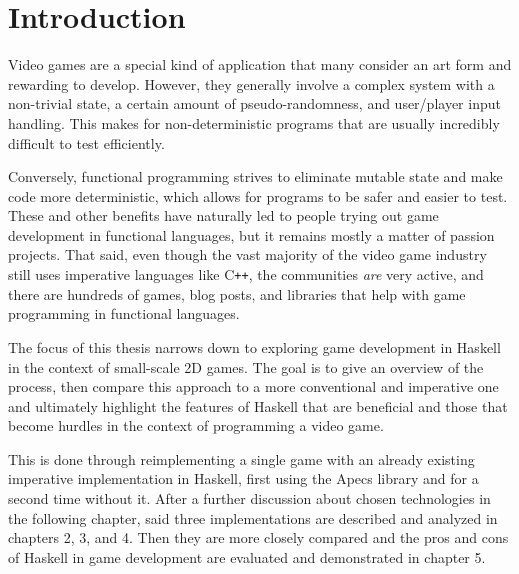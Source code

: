 \documentclass[
  digital, %
  color,   %
  table,   %
  oneside, %
  lof,     %
  lot,     %
]{fithesis3}
\newcommand{\cpp}{C\nolinebreak\texttt{+}\nolinebreak\texttt{+}}
\begin{document}
\chapter*{Introduction}
\label{chptr:introduction}


Video games are a special kind of application that many consider an art form
and rewarding to develop. However, they generally involve a complex system
with a non-trivial state, a certain amount of pseudo-randomness,
and user/player input handling. This makes for non-deterministic
programs that are usually incredibly difficult to test efficiently.

Conversely, functional programming strives to eliminate
mutable state and make code more deterministic, which allows for
programs to be safer and easier to test.
These and other benefits have naturally led to people
trying out game development in functional languages, but
it remains mostly a matter of passion projects.
That said, even though the vast majority of the video game industry
still uses imperative languages like \cpp{}, the communities
\emph{are} very active, and there are hundreds of games,
blog posts, and libraries that help with
game programming in functional languages.

The focus of this thesis narrows down to exploring game development
in Haskell in the context of small-scale 2D games. The goal is
to give an overview of the process, then compare this approach
to a more conventional and imperative one
and ultimately highlight the features of Haskell that are beneficial
and those that become hurdles in the context of programming a video game.

This is done through reimplementing a single game with an already existing
imperative implementation in Haskell,
first using the Apecs library
and for a second time without it. After a further discussion
about chosen technologies in the following chapter,
said three implementations are described and analyzed
in chapters 2, 3, and 4. Then they are more closely compared
and the pros and cons of Haskell in game development are
evaluated and demonstrated in chapter 5.
\end{document}
